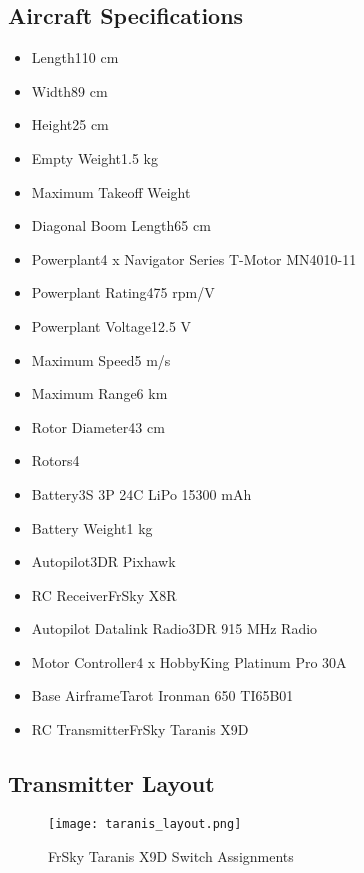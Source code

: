 \documentclass{report}
\begin{document}
		\subsection{Aircraft Specifications}
			\begin{itemize}
				\item Length\hfill110 cm
				\item Width\hfill89 cm
				\item Height\hfill25 cm
				\item Empty Weight\hfill1.5 kg
				\item Maximum Takeoff Weight\hfill
				\item Diagonal Boom Length\hfill65 cm
				\item Powerplant\hfill 4 x Navigator Series T-Motor MN4010-11
				\item Powerplant Rating\hfill475 rpm/V
				\item Powerplant Voltage\hfill12.5 V
				\item Maximum Speed\hfill 5 m/s
				\item Maximum Range\hfill 6 km
				\item Rotor Diameter\hfill 43 cm
				\item Rotors\hfill4
				\item Battery\hfill 3S 3P 24C \gls{LiPo} 15300 mAh
				\item Battery Weight\hfill 1 kg
				\item Autopilot\hfill3DR Pixhawk
				\item RC Receiver\hfill FrSky X8R
				\item Autopilot Datalink Radio\hfill 3DR 915 MHz Radio
				\item Motor Controller\hfill 4 x HobbyKing Platinum Pro 30A
				\item Base Airframe\hfill Tarot Ironman 650 TI65B01
				\item RC Transmitter\hfill FrSky Taranis X9D
			\end{itemize}
		\subsection{Transmitter Layout}
			\begin{figure}[ht]
				\centering
				\caption{FrSky Taranis X9D Switch Assignments}
				\texttt{[image: taranis\_layout.png]}
				\label{fig:tx_layout}
			\end{figure}
\end{document}

